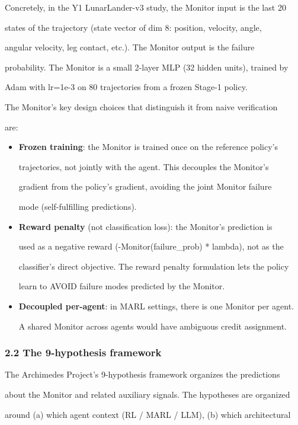 \documentclass[11pt]{article}
\begin{document}
Concretely, in the Y1 LunarLander-v3 study, the Monitor input is the
last 20

states of the trajectory (state vector of dim 8: position, velocity,
angle,

angular velocity, leg contact, etc.). The Monitor output is the failure

probability. The Monitor is a small 2-layer MLP (32 hidden units),
trained by

Adam with lr=1e-3 on 80 trajectories from a frozen Stage-1 policy.

The Monitor's key design choices that distinguish it from naive
verification

are:

\begin{itemize}
\item
  \textbf{Frozen training}: the Monitor is trained once on the reference
  policy's

  trajectories, not jointly with the agent. This decouples the Monitor's

  gradient from the policy's gradient, avoiding the joint Monitor
  failure

  mode (self-fulfilling predictions).
\item
  \textbf{Reward penalty} (not classification loss): the Monitor's
  prediction is

  used as a negative reward (-Monitor(failure\_prob) * lambda), not as
  the

  classifier's direct objective. The reward penalty formulation lets the
  policy

  learn to AVOID failure modes predicted by the Monitor.
\item
  \textbf{Decoupled per-agent}: in MARL settings, there is one Monitor
  per agent.

  A shared Monitor across agents would have ambiguous credit assignment.
\end{itemize}

\subsubsection{2.2 The 9-hypothesis
framework}\label{the-9-hypothesis-framework}

The Archimedes Project's 9-hypothesis framework organizes the
predictions

about the Monitor and related auxiliary signals. The hypotheses are
organized

around (a) which agent context (RL / MARL / LLM), (b) which
architectural
\end{document}
